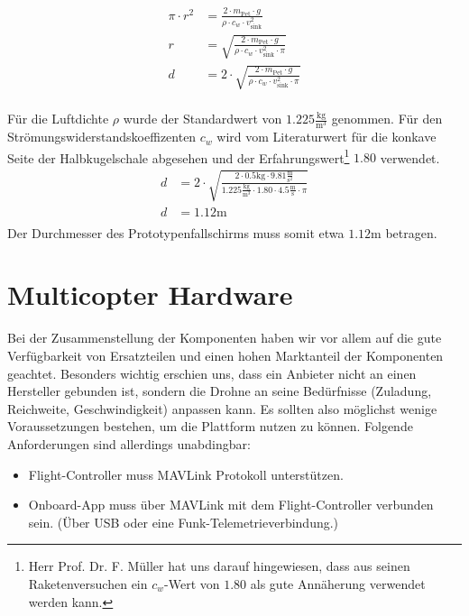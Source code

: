 \begin{equation}
\begin{split}
\pi \cdot r^2 &= \frac{2 \cdot m_{\text{Pet}} \cdot g}{\rho \cdot c_{w} \cdot v_{\text{sink}}^{2} } \\
r &= \sqrt{\frac{2 \cdot m_{\text{Pet}} \cdot g}{\rho \cdot c_{w} \cdot v_{\text{sink}}^{2} \cdot \pi}} \\
d &= 2 \cdot \sqrt{\frac{2 \cdot m_{\text{Pet}} \cdot g}{\rho \cdot c_{w} \cdot v_{\text{sink}}^{2} \cdot \pi}} \\
\end{split}
\end{equation}

Für die Luftdichte $\rho$ wurde der Standardwert von $1.225 \frac{\text{kg}}{\text{m}^{3}}$ genommen. Für den Strömungswiderstandskoeffizenten $c_w$ wird vom Literaturwert für die konkave Seite der Halbkugelschale abgesehen und der Erfahrungswert\footnote{Herr Prof. Dr. F. Müller hat uns darauf hingewiesen, dass aus seinen Raketenversuchen ein $c_w$-Wert von $1.80$ als gute Annäherung verwendet werden kann.} $1.80$ verwendet.
\begin{equation}
\begin{split}
d &= 2 \cdot \sqrt{\frac{2 \cdot 0.5\text{kg} \cdot  9.81\frac{\text{m}}{\text{s}^2}}{1.225 \frac{\text{kg}}{\text{m}^3} \cdot 1.80 \cdot 4.5 \frac{\text{m}}{\text{s}} \cdot \pi}} \\
d &= 1.12\text{m} \\
\end{split}
\end{equation}
Der Durchmesser des Prototypenfallschirms muss somit etwa $1.12 \text{m}$ betragen.

\newpage
\section{Multicopter Hardware}

Bei der Zusammenstellung der Komponenten haben wir vor allem auf die gute Verfügbarkeit von
Ersatzteilen und einen hohen Marktanteil der Komponenten geachtet. Besonders wichtig erschien uns, dass ein Anbieter nicht an einen Hersteller gebunden ist, sondern die Drohne an seine Bedürfnisse (Zuladung, Reichweite, Geschwindigkeit) anpassen kann. Es sollten also möglichst wenige Voraussetzungen bestehen, um die Plattform nutzen zu können. Folgende Anforderungen sind allerdings unabdingbar:
\begin{itemize}
	\item \Gls{Flight-Controller} muss \Gls{MAVLink} Protokoll unterstützen.
	\item Onboard-App muss über \Gls{MAVLink} mit dem \Gls{Flight-Controller} verbunden sein. (Über USB oder eine Funk-Telemetrieverbindung.)
\end{itemize}

